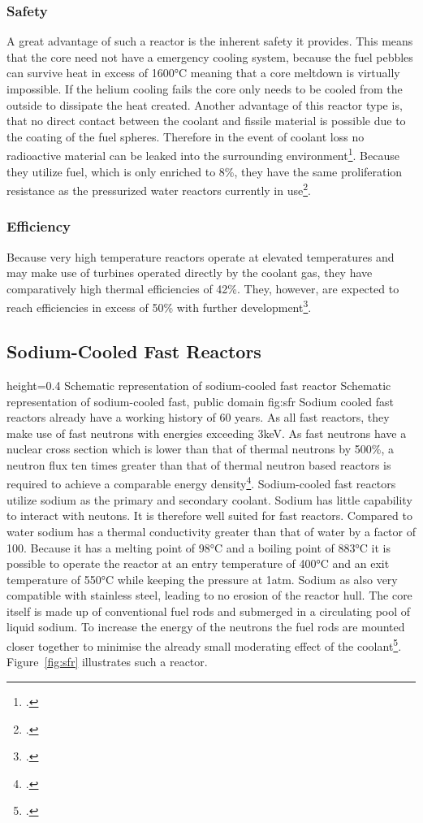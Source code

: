 \subsubsection{Safety}
A great advantage of such a reactor is the inherent safety it provides. This means that the core
need not have a emergency cooling system, because the fuel pebbles can survive heat in excess of 1600°C
meaning that a core meltdown is virtually impossible. If the helium cooling fails the core only needs to
be cooled from the outside to dissipate the heat created. Another advantage of this reactor type is, that
no direct contact between the coolant and fissile material is possible due to the coating of the fuel
spheres. Therefore in the event of coolant loss no radioactive material can be leaked
into the surrounding environment\footcite[18-21]{VHTRTS}.
Because they utilize fuel, which is only enriched to 8\%, they have the same proliferation resistance
as the pressurized water reactors currently in use\footcite{VHTRTS}.
\subsubsection{Efficiency}
Because very high temperature reactors operate at elevated temperatures and may make use of turbines
operated directly by the coolant gas, they have comparatively high thermal efficiencies of 42\%.
They, however, are expected to reach efficiencies in excess of 50\% with further development\footcite[62]{T4Gen}.
\pagebreak
\subsection{Sodium-Cooled Fast Reactors}\label{chap:sfr}
    {height=0.4\textheight}
    {Schematic representation of sodium-cooled fast reactor}
    {Schematic representation of sodium-cooled fast, public domain}
    {fig:sfr}
Sodium cooled fast reactors already have a working history of 60 years. As all fast reactors, they make
use of fast neutrons with energies exceeding 3keV. As fast neutrons have a nuclear cross section which is lower than that
of thermal neutrons by 500\%, a neutron flux ten times greater than that of thermal neutron based reactors
is required to achieve a comparable energy density\footcite[120-122]{ReactorPhysics}.
Sodium-cooled fast reactors utilize sodium as the primary and secondary coolant. Sodium has little
capability to interact with neutons. It is therefore well suited for fast reactors. Compared
to water sodium has a thermal conductivity greater than that of water by a factor of 100. Because
it has a melting point of 98°C and a boiling point of 883°C it is possible to operate the reactor at an
entry temperature of 400°C and an exit temperature of 550°C while keeping the pressure at 1atm. Sodium
as also very compatible with stainless steel, leading to no erosion of the reactor hull. The core
itself is made up of conventional fuel rods and submerged in a circulating pool of liquid sodium.
To increase the energy of the neutrons the fuel rods are mounted closer together to minimise the
already small moderating effect of the coolant\footcite[94-110]{T4Gen}. Figure~\ref{fig:sfr} illustrates
such a reactor.
